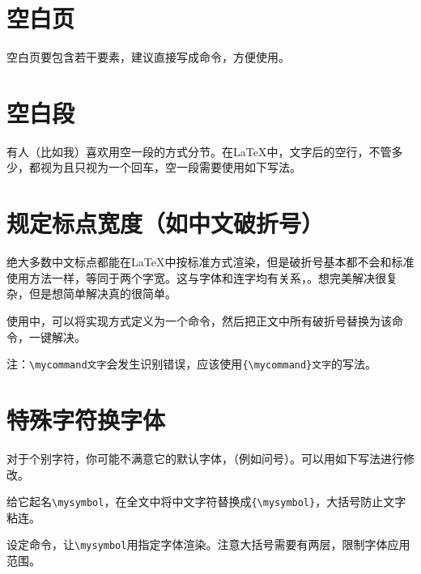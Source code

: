 \documentclass[10pt,openany]{book}
\begin{document}
\begin{sloppypar}
    \section{空白页}

    空白页要包含若干要素，建议直接写成命令，方便使用。

    

    \section{空白段}
    \label{blankpar}

    有人（比如我）喜欢用空一段的方式分节。在{\LaTeX}中，文字后的空行，不管多少，都视为且只视为一个回车，空一段需要使用如下写法。

    

    \section{规定标点宽度（如中文破折号）}
    \label{chsline}

    绝大多数中文标点都能在{\LaTeX}中按标准方式渲染，但是破折号基本都不会和标准使用方法一样，等同于两个字宽。这与字体和连字均有关系，。想完美解决很复杂，但是想简单解决真的很简单。

    

    使用中，可以将实现方式定义为一个命令，然后把正文中所有破折号替换为该命令，一键解决。

    注：\texttt{\textbackslash{}mycommand\hspace{-0.1em}文字}会发生识别错误，应该使用\texttt{\{\textbackslash{}mycommand\}文字}的写法。

    \section{特殊字符换字体}

    对于个别字符，你可能不满意它的默认字体，（例如问号）。可以用如下写法进行修改。

    给它起名\texttt{\textbackslash{}mysymbol}，在全文中将中文字符替换成\texttt{\{\textbackslash{}mysymbol\}}，大括号防止文字粘连。

    设定命令，让\texttt{\textbackslash{}mysymbol}用指定字体渲染。注意大括号需要有两层，限制字体应用范围。


\end{sloppypar}
\end{document}
